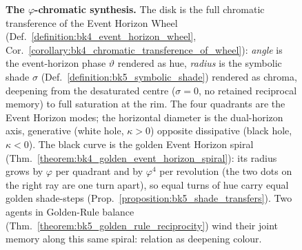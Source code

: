 \begin{figure}[ht]
\caption[The $\varphi$-chromatic synthesis]{\textbf{The $\varphi$-chromatic
synthesis.} The disk is the full chromatic transference of the Event Horizon Wheel
(Def.~\ref{definition:bk4_event_horizon_wheel},
Cor.~\ref{corollary:bk4_chromatic_transference_of_wheel}): \emph{angle} is the
event-horizon phase $\vartheta$ rendered as hue, \emph{radius} is the symbolic shade
$\sigma$ (Def.~\ref{definition:bk5_symbolic_shade}) rendered as chroma, deepening from
the desaturated centre ($\sigma=0$, no retained reciprocal memory) to full saturation
at the rim. The four quadrants are the Event Horizon modes; the horizontal diameter is
the dual-horizon axis, generative (white hole, $\kappa>0$) opposite dissipative (black
hole, $\kappa<0$). The black curve is the golden Event Horizon spiral
(Thm.~\ref{theorem:bk4_golden_event_horizon_spiral}): its radius grows by $\varphi$ per
quadrant and by $\varphi^{4}$ per revolution (the two dots on the right ray are one
turn apart), so equal turns of hue carry equal golden shade-steps
(Prop.~\ref{proposition:bk5_shade_transfers}). Two agents in Golden-Rule balance
(Thm.~\ref{theorem:bk5_golden_rule_reciprocity}) wind their joint memory along this
same spiral: relation as deepening colour.}
\label{figure:bk5_phi_chromatic_synthesis}
\end{figure}
